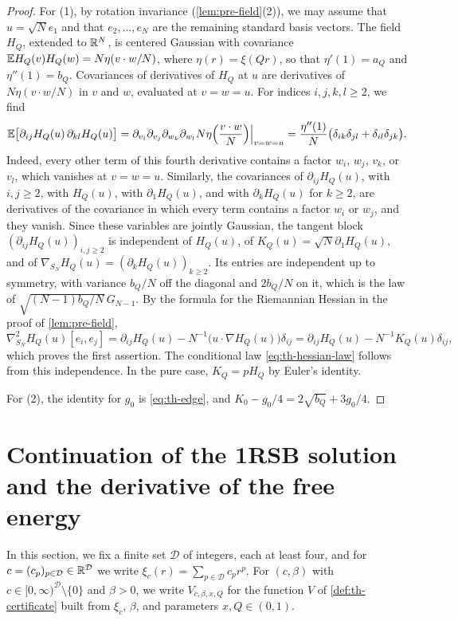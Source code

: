\begin{proof}
For (1), by rotation invariance (\cref{lem:pre-field}(2)), we may assume that $u=\sqrt Ne_1$ and that $e_2,\dots,e_N$ are the remaining standard basis vectors. The field $H_Q$, extended to $\mathbb R^N$, is centered Gaussian with covariance $\mathbb E H_Q(v)H_Q(w)=N\eta(v\cdot w/N)$, where $\eta(r)=\xi(Qr)$, so that $\eta'(1)=a_Q$ and $\eta''(1)=b_Q$. Covariances of derivatives of $H_Q$ at $u$ are derivatives of $N\eta(v\cdot w/N)$ in $v$ and $w$, evaluated at $v=w=u$. For indices $i,j,k,l\ge2$, we find
\[
\mathbb E\big[\partial_{ij}H_Q(u)\,\partial_{kl}H_Q(u)\big]=\partial_{v_i}\partial_{v_j}\partial_{w_k}\partial_{w_l}N\eta\Big(\frac{v\cdot w}N\Big)\Big|_{v=w=u}=\frac{\eta''(1)}N\big(\delta_{ik}\delta_{jl}+\delta_{il}\delta_{jk}\big).
\]
Indeed, every other term of this fourth derivative contains a factor $w_i$, $w_j$, $v_k$, or $v_l$, which vanishes at $v=w=u$. Similarly, the covariances of $\partial_{ij}H_Q(u)$, with $i,j\ge2$, with $H_Q(u)$, with $\partial_1H_Q(u)$, and with $\partial_kH_Q(u)$ for $k\ge2$, are derivatives of the covariance in which every term contains a factor $w_i$ or $w_j$, and they vanish. Since these variables are jointly Gaussian, the tangent block $(\partial_{ij}H_Q(u))_{i,j\ge2}$ is independent of $H_Q(u)$, of $K_Q(u)=\sqrt N\partial_1H_Q(u)$, and of $\nabla_{S_N}H_Q(u)=(\partial_kH_Q(u))_{k\ge2}$. Its entries are independent up to symmetry, with variance $b_Q/N$ off the diagonal and $2b_Q/N$ on it, which is the law of $\sqrt{(N-1)b_Q/N}\,G_{N-1}$. By the formula for the Riemannian Hessian in the proof of \cref{lem:pre-field},
\[
\nabla^2_{S_N}H_Q(u)[e_i,e_j]=\partial_{ij}H_Q(u)-N^{-1}\big(u\cdot\nabla H_Q(u)\big)\delta_{ij}=\partial_{ij}H_Q(u)-N^{-1}K_Q(u)\delta_{ij},
\]
which proves the first assertion. The conditional law \eqref{eq:th-hessian-law} follows from this independence. In the pure case, $K_Q=pH_Q$ by Euler's identity.

For (2), the identity for $g_0$ is \eqref{eq:th-edge}, and $K_0-g_0/4=2\sqrt{b_Q}+3g_0/4$.
\end{proof}

\section{Continuation of the 1RSB solution and the derivative of the free energy}\label{sec:th-continuation}

In this section, we fix a finite set $\mathcal D$ of integers, each at least four, and for $c=(c_p)_{p\in\mathcal D}\in\mathbb R^{\mathcal D}$ we write $\xi_c(r)=\sum_{p\in\mathcal D}c_pr^p$. For $(c,\beta)$ with $c\in[0,\infty)^{\mathcal D}\setminus\{0\}$ and $\beta>0$, we write $V_{c,\beta,x,Q}$ for the function $V$ of \cref{def:th-certificate} built from $\xi_c$, $\beta$, and parameters $x,Q\in(0,1)$.

